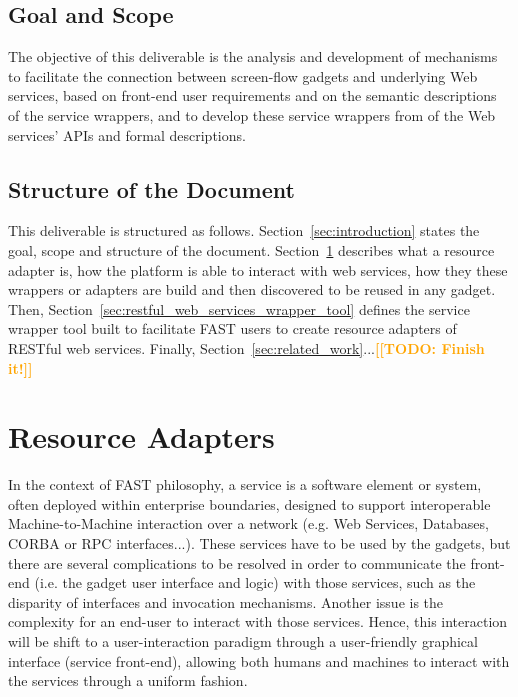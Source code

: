 \documentclass{fast_latex}
\newcommand{\todo}[1]{\textsf{\textbf{\textcolor{Orange}{[[TODO: #1]]}}}}
\newcommand{\todo}[1]{}
\begin{document}
\subsection{Goal and Scope} %
\label{sub:goal_and_scope}

The objective of this deliverable is the analysis and development of mechanisms to facilitate the connection between screen-flow gadgets and underlying Web services, based on front-end user requirements and on the semantic descriptions of the service wrappers, and to develop these service wrappers from of the Web services' APIs and formal descriptions.


\subsection{Structure of the Document} %
\label{sub:structure_of_the_document}

This deliverable is structured as follows. Section~\ref{sec:introduction} states the goal, scope and structure of the document. Section~\ref{sec:resource_adapters} describes what a resource adapter is, how the platform is able to interact with web services, how they these wrappers or adapters are build and then discovered to be reused in any gadget. Then, Section~\ref{sec:restful_web_services_wrapper_tool} defines the service wrapper tool built to facilitate FAST users to create resource adapters of RESTful web services. Finally, Section~\ref{sec:related_work}...\todo{Finish it!}


\clearpage
\section{Resource Adapters} %
\label{sec:resource_adapters}

In the context of FAST philosophy, a service is a software element or system, often deployed within enterprise boundaries, designed to support interoperable Machine-to-Machine interaction over a network (e.g. Web Services, Databases, CORBA or RPC interfaces...). These services have to be used by the gadgets, but there are several complications to be resolved in order to communicate the front-end (i.e. the gadget user interface and logic) with those services, such as the disparity of interfaces and invocation mechanisms. Another issue is the complexity for an end-user to interact with those services. Hence, this interaction will be shift to a user-interaction paradigm through a user-friendly graphical interface (service front-end), allowing both humans and machines to interact with the services through a uniform fashion.
\end{document}

